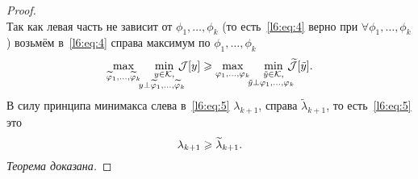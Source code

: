 \documentclass[12pt,a4paper,openany,fleqn]{book}
\newcommand{\J}{\ensuremath{\mathcal{J}}}
\newcommand{\mc}[1]{\ensuremath{\mathcal{#1}}}
\newcommand{\K}{\mc{K}}
\theoremstyle{definition}
\begin{document}
\begin{proof}
\begin{equation}
		\end{equation}
		 Так как левая часть не зависит от $\phi_1,\ldots,\phi_k$ (то есть~\eqref{l6:eq:4} верно при $\forall\phi_1,\ldots,\phi_k$) возьмём в~\eqref{l6:eq:4} справа максимум по $\phi_1,\ldots,\phi_k$
		 \begin{equation}
		 		\label{l6:eq:5}
		 	\hfill\max\limits_{\widetilde{\phi}_1,\ldots,\widetilde{\phi}_k}\quad\min\limits_{\substack{y\in\K,\\\lefteqn{\scriptstyle \hspace*{-0.8cm}y\perp\widetilde{\phi}_1,\ldots,\widetilde{\phi}_k}}}\,\J[y]\geqslant\max\limits_{{\phi}_1,\ldots,{\phi}_k}\quad\min\limits_{\substack{\tilde{y}\in\K,\\\lefteqn{\scriptstyle \hspace*{-0.8cm}\tilde{y}\perp\phi_1,\ldots,\phi_{k}}}}\,\widetilde{\J}[\tilde{y}].\hfill
		 \end{equation}
	 В силу принципа минимакса слева в~\eqref{l6:eq:5} $\lambda_{k+1}$, справа $\widetilde{\lambda}_{k+1}$, то есть~\eqref{l6:eq:5} это 
	 \begin{equation}
	 	\label{l6:eq:6}
	 	\hfill\lambda_{k+1}\geqslant\widetilde{\lambda}_{k+1}.\hfill
	 \end{equation}
 	\emph{Теорема доказана.}
	\end{proof}
	
\end{document}
